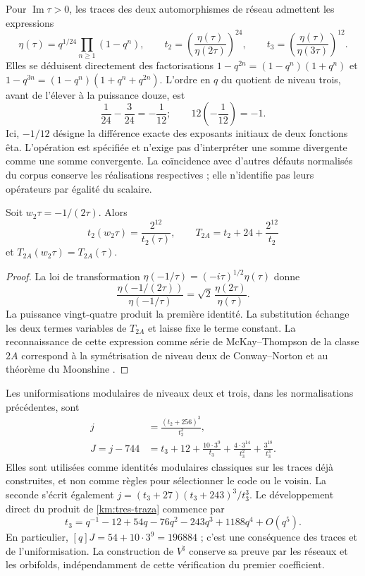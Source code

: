 Pour \(\operatorname{Im}\tau>0\), les traces des deux automorphismes de réseau admettent les expressions
\begin{equation}
 \eta(\tau)=q^{1/24}\prod_{n\ge1}(1-q^n),\qquad
 t_2=\left(\frac{\eta(\tau)}{\eta(2\tau)}\right)^{24},\qquad
 t_3=\left(\frac{\eta(\tau)}{\eta(3\tau)}\right)^{12}.
 \label{km:eta-trazas}
\end{equation}
Elles se déduisent directement des factorisations
\(1-q^{2n}=(1-q^n)(1+q^n)\) et
\(1-q^{3n}=(1-q^n)(1+q^n+q^{2n})\). L'ordre en \(q\) du
quotient de niveau trois, avant de l'élever à la puissance douze, est
\[
 \frac1{24}-\frac3{24}=-\frac1{12};
 \qquad 12\left(-\frac1{12}\right)=-1.
\]
Ici, \(-1/12\) désigne la différence exacte des exposants initiaux de deux fonctions êta. L'opération est spécifiée et n'exige pas d'interpréter une somme divergente comme une somme convergente. La coïncidence avec d'autres défauts normalisés du corpus conserve les réalisations respectives ; elle n'identifie pas leurs opérateurs par égalité du scalaire.

\begin{proposition}
\label{km:fricke-prop}
Soit \(w_2\tau=-1/(2\tau)\). Alors
\begin{equation}
 t_2(w_2\tau)=\frac{2^{12}}{t_2(\tau)},\qquad
 T_{2A}=t_2+24+\frac{2^{12}}{t_2}
 \label{km:fricke-t2}
\end{equation}
et \(T_{2A}(w_2\tau)=T_{2A}(\tau)\).
\end{proposition}
\begin{proof}
La loi de transformation
\(\eta(-1/\tau)=(-i\tau)^{1/2}\eta(\tau)\) donne
\[
 \frac{\eta(-1/(2\tau))}{\eta(-1/\tau)}
 =\sqrt2\,\frac{\eta(2\tau)}{\eta(\tau)}.
\]
La puissance vingt-quatre produit la première identité. La substitution
échange les deux termes variables de \(T_{2A}\) et laisse fixe
le terme constant. La reconnaissance de cette expression comme série
de McKay--Thompson de la classe \(2A\) correspond à la
symétrisation de niveau deux de Conway--Norton
\cite[\S\S4 y 6, tabla~3]{kmconwaynorton1979} et au théorème
du Moonshine \cite{borcherds}.
\end{proof}

Les uniformisations modulaires de niveaux deux et trois, dans les
normalisations précédentes, sont
\begin{align}
 j&=\frac{(t_2+256)^3}{t_2^2},
 \label{km:j-nivel2}\\
 J=j-744
 &=t_3+12+\frac{10\cdot3^9}{t_3}
       +\frac{4\cdot3^{14}}{t_3^2}
       +\frac{3^{18}}{t_3^3}.
 \label{km:j-nivel3}
\end{align}
Elles sont utilisées comme identités modulaires classiques sur les traces déjà
construites, et non comme règles pour sélectionner le code ou le voisin.
La seconde s'écrit également
\(j=(t_3+27)(t_3+243)^3/t_3^3\).
Le développement direct du produit de \eqref{km:tres-traza} commence par
\[
 t_3=q^{-1}-12+54q-76q^2-243q^3+1188q^4+O(q^5).
\]
En particulier, \([q]J=54+10\cdot3^9=196884\) ; c'est une conséquence des traces et de l'uniformisation. La construction de \(V^\natural\) conserve sa preuve par les réseaux et les orbifolds, indépendamment de cette vérification du premier coefficient.

